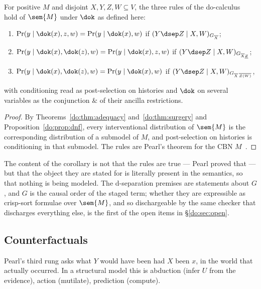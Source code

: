 \begin{corollary}
\label{do:cor:rules}
For positive $M$ and disjoint $X,Y,Z,W \subseteq V$, the three rules of the
do-calculus~\cite{Pearl95} hold of $\sem{M}$ under $\dok$ as defined here:
\begin{enumerate}[leftmargin=1.6em,itemsep=1pt]
\item $\Pr(y \mid \dok(x), z, w) = \Pr(y \mid \dok(x), w)$ if
      $(Y \dsep Z \mid X, W)_{G_{\overline{X}}}$;
\item $\Pr(y \mid \dok(x), \dok(z), w) = \Pr(y \mid \dok(x), z, w)$ if
      $(Y \dsep Z \mid X, W)_{G_{\overline{X}\underline{Z}}}$;
\item $\Pr(y \mid \dok(x), \dok(z), w) = \Pr(y \mid \dok(x), w)$ if
      $(Y \dsep Z \mid X, W)_{G_{\overline{X}\,\overline{Z(W)}}}$,
\end{enumerate}
with conditioning read as post-selection on histories and $\dok$ on several variables as the
conjunction $\&$ of their ancilla restrictions.
\end{corollary}

\begin{proof}
By Theorems~\ref{do:thm:adequacy} and~\ref{do:thm:surgery} and
Proposition~\ref{do:prop:dnf}, every interventional distribution of $\sem{M}$ is the
corresponding distribution of a submodel of $M$, and post-selection on histories is conditioning
in that submodel. The rules are Pearl's theorem for the CBN $M$~\cite{Pearl95,Pearl09}.
\end{proof}

The content of the corollary is not that the rules are true --- Pearl proved that --- but that the
object they are stated for is literally present in the semantics, so that nothing is being
modeled. The d-separation premises are statements about $G$, and $G$ is the causal order of the
staged term; whether they are expressible as crisp-sort formulae over $\sem{M}$, and so
dischargeable by the same checker that discharges everything else, is the first of the open items
in \S\ref{do:sec:open}.

\subsection{Counterfactuals}
\label{do:sec:cf}

Pearl's third rung asks what $Y$ would have been had $X$ been $x$, in the world that actually
occurred. In a structural model this is abduction (infer $U$ from the evidence), action
(mutilate), prediction (compute).

